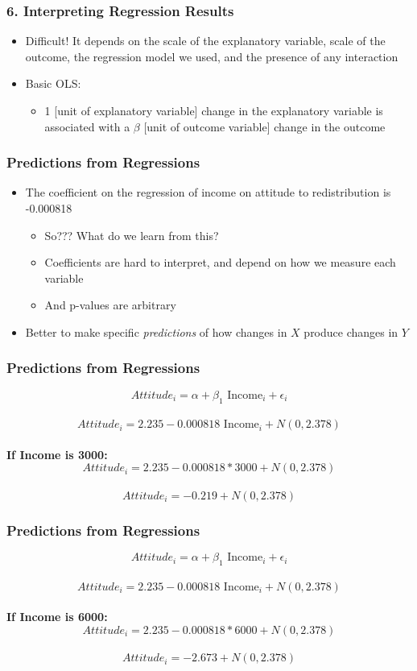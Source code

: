 \documentclass[xcolor=x11names,compress]{beamer}\usepackage[]{graphicx}\usepackage[]{color}
\renewcommand{\(}{\begin{columns}}
\renewcommand{\)}{\end{columns}}
\newcommand{\<}[1]{\begin{column}{#1}}
\renewcommand{\>}{\end{column}}
\begin{document}
\begin{frame}
\frametitle{6. Interpreting Regression Results}
\begin{itemize}
\item Difficult! It depends on the scale of the explanatory variable, scale of the outcome, the regression model we used, and the presence of any interaction
\item Basic OLS:
\begin{itemize}
\item 1 [unit of explanatory variable] change in the explanatory variable is associated with a $\beta$ [unit of outcome variable] change in the outcome
\end{itemize}
\end{itemize}
\end{frame}



\begin{frame}
\frametitle{Predictions from Regressions}
\begin{itemize}
\item The coefficient on the regression of income on attitude to redistribution is -0.000818
\begin{itemize}
\pause
\item So??? What do we learn from this?
\pause
\item Coefficients are hard to interpret, and depend on how we measure each variable
\item And p-values are arbitrary
\end{itemize}  
\pause
\item Better to make specific \textit{predictions} of how changes in $X$ produce changes in $Y$
\end{itemize}
\end{frame}

\begin{frame}
\frametitle{Predictions from Regressions}
$$Attitude_i = \alpha + \beta_1 \text{ Income}_i + \epsilon_i$$ \\
\pause
$$Attitude_i = 2.235 - 0.000818 \text{ Income}_i + N(0,2.378)$$ \\
\pause
\textbf{If Income is 3000:}  \\
$$Attitude_i = 2.235-0.000818*3000 + N(0,2.378)$$ \\
$$Attitude_i = -0.219 + N(0,2.378)$$
\end{frame}

\begin{frame}
\frametitle{Predictions from Regressions}
$$Attitude_i = \alpha + \beta_1 \text{ Income}_i + \epsilon_i$$ \\
$$Attitude_i = 2.235 - 0.000818 \text{ Income}_i + N(0,2.378)$$ \\
\textbf{If Income is 6000:}  \\
$$Attitude_i = 2.235-0.000818*6000 + N(0,2.378)$$ \\
$$Attitude_i = -2.673 + N(0,2.378)$$
\end{frame}
\end{document}

